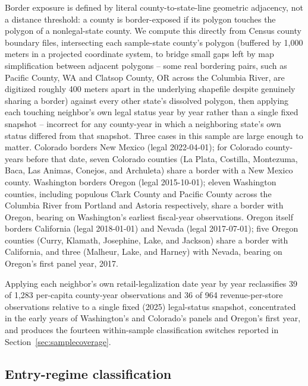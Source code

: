 \documentclass[12pt]{article}
\begin{document}
Border exposure is defined by literal county-to-state-line geometric adjacency, not a distance threshold: a
county is border-exposed if its polygon touches the polygon of a nonlegal-state county. We compute this
directly from Census county boundary files, intersecting each sample-state county's polygon (buffered by
1,000 meters in a projected coordinate system, to bridge small gaps left by map simplification between
adjacent polygons -- some real bordering pairs, such as Pacific County, WA and Clatsop County, OR across the
Columbia River, are digitized roughly 400 meters apart in the underlying shapefile despite genuinely sharing a
border) against every other state's dissolved polygon, then applying each touching neighbor's own legal status
year by year rather than a single fixed snapshot -- incorrect for any county-year in which a neighboring
state's own status differed from that snapshot. Three cases in this sample are large enough to matter.
Colorado borders New Mexico (legal 2022-04-01); for Colorado county-years before that date, seven Colorado
counties (La Plata, Costilla, Montezuma, Baca, Las Animas, Conejos, and Archuleta) share a border with a New
Mexico county. Washington borders Oregon (legal 2015-10-01); eleven Washington counties, including populous
Clark County and Pacific County across the Columbia River from Portland and Astoria respectively, share a
border with Oregon, bearing on Washington's earliest fiscal-year observations. Oregon itself borders
California (legal 2018-01-01) and Nevada (legal 2017-07-01); five Oregon counties (Curry, Klamath, Josephine,
Lake, and Jackson) share a border with California, and three (Malheur, Lake, and Harney) with Nevada, bearing
on Oregon's first panel year, 2017.

Applying each neighbor's own retail-legalization date year by year reclassifies 39 of 1,283 per-capita
county-year observations and 36 of 964 revenue-per-store observations relative to a single fixed (2025)
legal-status snapshot, concentrated in the early years of Washington's and Colorado's panels and Oregon's
first year, and produces the fourteen within-sample classification switches reported in
Section~\ref{sec:samplecoverage}.

\subsection{Entry-regime classification}
\label{sec:entryregime}
\end{document}
